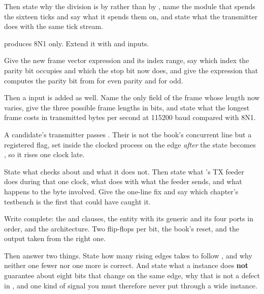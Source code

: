Then state why the division is by  rather than by , name the module that
spends the sixteen ticks and say what it spends them on, and state what the transmitter does with
the same tick stream. 

  produces 8N1 only. Extend it with  and 
inputs.

Give the new frame vector expression and its index range, say which index the parity bit occupies
and which the stop bit now does, and give the expression that computes the parity bit from
 for even parity and for odd.

Then a  input is added as well. Name the only field of the frame whose length now
varies, give the three possible frame lengths in bits, and state what the longest frame costs in
transmitted bytes per second at 115200 baud compared with 8N1. 

 A candidate's transmitter passes . Their  is not the book's
concurrent line but a registered flag, set inside the clocked process on the edge \emph{after} the
state becomes , so it rises one clock late.

State what  checks about  and what it does not. Then state what
's TX feeder does during that one clock, what  does with what the
feeder sends, and what happens to the byte involved. Give the one-line fix and say which chapter's
testbench is the first that could have caught it. 

\label{exb:q:3}

 Write  complete: the  and  clauses, the entity with
its generic and its four ports in order, and the architecture. Two flip-flops per bit, the book's
reset, and the output taken from the right one.

Then answer two things. State how many rising edges  takes to follow
, and why neither one fewer nor one more is correct. And state what a
 instance does \textbf{not} guarantee about eight bits that change on the same edge,
why that is not a defect in , and one kind of signal you must therefore never put
through a wide instance. 

